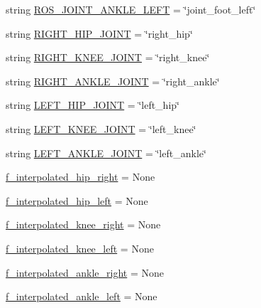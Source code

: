 \begin{DoxyCompactItemize}
\item 
string \mbox{\hyperlink{namespacepedal__simulation_a402a36b90d4ebf203bc19976ec7d52c6}{R\+O\+S\+\_\+\+J\+O\+I\+N\+T\+\_\+\+A\+N\+K\+L\+E\+\_\+\+L\+E\+FT}} = \char`\"{}joint\+\_\+foot\+\_\+left\char`\"{}
\item 
string \mbox{\hyperlink{namespacepedal__simulation_a90d2f00ff0e334bc02f23bcd4b540d8c}{R\+I\+G\+H\+T\+\_\+\+H\+I\+P\+\_\+\+J\+O\+I\+NT}} = \char`\"{}right\+\_\+hip\char`\"{}
\item 
string \mbox{\hyperlink{namespacepedal__simulation_a28d4609f3a19f8e565ae3548ef73f990}{R\+I\+G\+H\+T\+\_\+\+K\+N\+E\+E\+\_\+\+J\+O\+I\+NT}} = \char`\"{}right\+\_\+knee\char`\"{}
\item 
string \mbox{\hyperlink{namespacepedal__simulation_a277daee547841cc41def2598a8beb6f1}{R\+I\+G\+H\+T\+\_\+\+A\+N\+K\+L\+E\+\_\+\+J\+O\+I\+NT}} = \char`\"{}right\+\_\+ankle\char`\"{}
\item 
string \mbox{\hyperlink{namespacepedal__simulation_a5ff646330c3b18de13c02db035719f48}{L\+E\+F\+T\+\_\+\+H\+I\+P\+\_\+\+J\+O\+I\+NT}} = \char`\"{}left\+\_\+hip\char`\"{}
\item 
string \mbox{\hyperlink{namespacepedal__simulation_a2e12c9299a343186db2633fc43b777c8}{L\+E\+F\+T\+\_\+\+K\+N\+E\+E\+\_\+\+J\+O\+I\+NT}} = \char`\"{}left\+\_\+knee\char`\"{}
\item 
string \mbox{\hyperlink{namespacepedal__simulation_ab65f757e695ae70c2659ce5fe3eeef5d}{L\+E\+F\+T\+\_\+\+A\+N\+K\+L\+E\+\_\+\+J\+O\+I\+NT}} = \char`\"{}left\+\_\+ankle\char`\"{}
\item 
\mbox{\hyperlink{namespacepedal__simulation_a05ef2cb307a77cd05aef72e674e85b1b}{f\+\_\+interpolated\+\_\+hip\+\_\+right}} = None
\item 
\mbox{\hyperlink{namespacepedal__simulation_a52ac279ba5c998ecd78c81f82d423ebb}{f\+\_\+interpolated\+\_\+hip\+\_\+left}} = None
\item 
\mbox{\hyperlink{namespacepedal__simulation_af3d5d505e88dc9ced05c882d7948e52a}{f\+\_\+interpolated\+\_\+knee\+\_\+right}} = None
\item 
\mbox{\hyperlink{namespacepedal__simulation_a2f801c811b9b460e5ff3cbf80332ab6a}{f\+\_\+interpolated\+\_\+knee\+\_\+left}} = None
\item 
\mbox{\hyperlink{namespacepedal__simulation_a99a03a1ef0cf50f4bd54b595ef1ac1fd}{f\+\_\+interpolated\+\_\+ankle\+\_\+right}} = None
\item 
\mbox{\hyperlink{namespacepedal__simulation_ad7862dec42aa23f9afe0dd180b11d046}{f\+\_\+interpolated\+\_\+ankle\+\_\+left}} = None

\end{DoxyCompactItemize}
